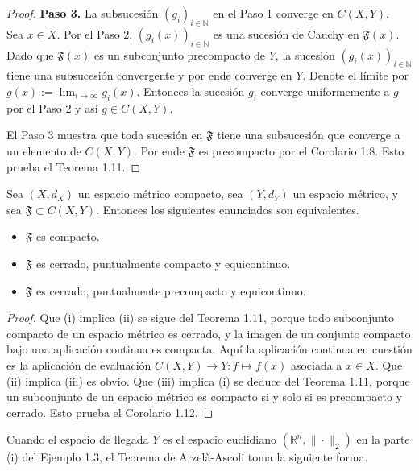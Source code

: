 \begin{proof}
\noindent \textbf{Paso 3.} La subsucesión $(g_{i})_{i\in\mathbb{N}}$ en el Paso 1 converge en $C(X,Y)$.
\\ Sea $x\in X$. Por el Paso 2, $(g_{i}(x))_{i\in\mathbb{N}}$ es una sucesión de Cauchy en $\mathfrak{F}(x)$. Dado que $\mathfrak{F}(x)$ es un subconjunto precompacto de $Y$, la sucesión $(g_{i}(x))_{i\in\mathbb{N}}$ tiene una subsucesión convergente y por ende converge en $Y$. Denote el límite por $g(x):=\lim_{i\rightarrow\infty}g_{i}(x)$. Entonces la sucesión $g_{i}$ converge uniformemente a $g$ por el Paso 2 y así $g\in C(X,Y)$.

El Paso 3 muestra que toda sucesión en $\mathfrak{F}$ tiene una subsucesión que converge a un elemento de $C(X,Y)$. Por ende $\mathfrak{F}$ es precompacto por el Corolario 1.8. Esto prueba el Teorema 1.11.
\end{proof}

\begin{corollary}\label{cor:1.12}
Sea $(X,d_{X})$ un espacio métrico compacto, sea $(Y,d_{Y})$ un espacio métrico, y sea $\mathfrak{F}\subset C(X,Y)$. Entonces los siguientes enunciados son equivalentes.
\begin{itemize}
    \item[(i)] $\mathfrak{F}$ es compacto.
    \item[(ii)] $\mathfrak{F}$ es cerrado, puntualmente compacto y equicontinuo.
    \item[(iii)] $\mathfrak{F}$ es cerrado, puntualmente precompacto y equicontinuo.
\end{itemize}
\end{corollary}
\begin{proof}
Que (i) implica (ii) se sigue del Teorema 1.11, porque todo subconjunto compacto de un espacio métrico es cerrado, y la imagen de un conjunto compacto bajo una aplicación continua es compacta. Aquí la aplicación continua en cuestión es la aplicación de evaluación $C(X,Y)\rightarrow Y:f\mapsto f(x)$ asociada a $x\in X$. Que (ii) implica (iii) es obvio. Que (iii) implica (i) se deduce del Teorema 1.11, porque un subconjunto de un espacio métrico es compacto si y solo si es precompacto y cerrado. Esto prueba el Corolario 1.12.
\end{proof}

Cuando el espacio de llegada $Y$ es el espacio euclidiano $(\mathbb{R}^{n},\|\cdot\|_{2})$ en la parte (i) del Ejemplo 1.3, el Teorema de Arzelà-Ascoli toma la siguiente forma.

